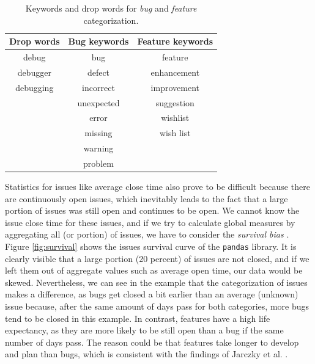 \begin{table}[!htbp]
    \centering
        \begin{tabular}{| c | c | c |}
            \hline
            \textbf{Drop words} & \textbf{Bug keywords} & \textbf{Feature keywords} \\
            \hline \hline
            debug & bug & feature \\
            debugger & defect & enhancement \\
            debugging & incorrect & improvement \\
             & unexpected & suggestion \\
             & error & wishlist \\
             & missing & wish list \\
             & warning & \\
             & problem & \\
            \hline
        \end{tabular}
    \caption{Keywords and drop words for \textit{bug} and \textit{feature} categorization.}
    \label{tab:keywords}
\end{table}

Statistics for issues like average close time also prove to be difficult because there are continuously open issues, which inevitably leads to the fact that a large portion of issues was still open and continues to be open. We cannot know the issue close time for these issues, and if we try to calculate global measures by aggregating all (or portion) of issues, we have to consider the \textit{survival bias} \cite{jarczykSurgicalTeamsGitHub2018}. Figure \ref{fig:survival} shows the issues survival curve of the \texttt{pandas} library. It is clearly visible that a large portion (20 percent) of issues are not closed, and if we left them out of aggregate values such as average open time, our data would be skewed. Nevertheless, we can see in the example that the categorization of issues makes a difference, as bugs get closed a bit earlier than an average (unknown) issue because, after the same amount of days pass for both categories, more bugs tend to be closed in this example. In contrast, features have a high life expectancy, as they are more likely to be still open than a bug if the same number of days pass. The reason could be that features take longer to develop and plan than bugs, which is consistent with the findings of Jarczky et al. \cite{jarczykSurgicalTeamsGitHub2018}.

